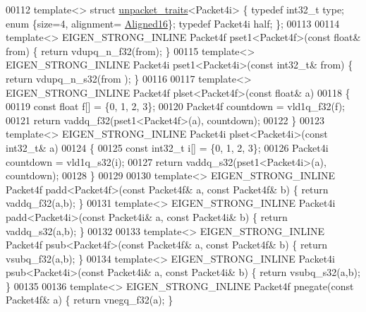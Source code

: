 \begin{DoxyCode}
{00112 \textcolor{keyword}{template}<> \textcolor{keyword}{struct }\hyperlink{struct_eigen_1_1internal_1_1unpacket__traits}{unpacket\_traits}<Packet4i> \{ \textcolor{keyword}{typedef} int32\_t type; \textcolor{keyword}{enum} \{size=4, alignment=
      \hyperlink{group__enums_gga45fe06e29902b7a2773de05ba27b47a1af8e2bf74b04c02199f62c5e3c06dbfcc}{Aligned16}\}; \textcolor{keyword}{typedef} Packet4i half; \};
00113 
00114 \textcolor{keyword}{template}<> EIGEN\_STRONG\_INLINE Packet4f pset1<Packet4f>(\textcolor{keyword}{const} \textcolor{keywordtype}{float}&  from) \{ \textcolor{keywordflow}{return} vdupq\_n\_f32(from); \}
00115 \textcolor{keyword}{template}<> EIGEN\_STRONG\_INLINE Packet4i pset1<Packet4i>(\textcolor{keyword}{const} int32\_t&    from)   \{ \textcolor{keywordflow}{return} vdupq\_n\_s32(from
      ); \}
00116 
00117 \textcolor{keyword}{template}<> EIGEN\_STRONG\_INLINE Packet4f plset<Packet4f>(\textcolor{keyword}{const} \textcolor{keywordtype}{float}& a)
00118 \{
00119   \textcolor{keyword}{const} \textcolor{keywordtype}{float} f[] = \{0, 1, 2, 3\};
00120   Packet4f countdown = vld1q\_f32(f);
00121   \textcolor{keywordflow}{return} vaddq\_f32(pset1<Packet4f>(a), countdown);
00122 \}
00123 \textcolor{keyword}{template}<> EIGEN\_STRONG\_INLINE Packet4i plset<Packet4i>(\textcolor{keyword}{const} int32\_t& a)
00124 \{
00125   \textcolor{keyword}{const} int32\_t i[] = \{0, 1, 2, 3\};
00126   Packet4i countdown = vld1q\_s32(i);
00127   \textcolor{keywordflow}{return} vaddq\_s32(pset1<Packet4i>(a), countdown);
00128 \}
00129 
00130 \textcolor{keyword}{template}<> EIGEN\_STRONG\_INLINE Packet4f padd<Packet4f>(\textcolor{keyword}{const} Packet4f& a, \textcolor{keyword}{const} Packet4f& b) \{ \textcolor{keywordflow}{return} 
      vaddq\_f32(a,b); \}
00131 \textcolor{keyword}{template}<> EIGEN\_STRONG\_INLINE Packet4i padd<Packet4i>(\textcolor{keyword}{const} Packet4i& a, \textcolor{keyword}{const} Packet4i& b) \{ \textcolor{keywordflow}{return} 
      vaddq\_s32(a,b); \}
00132 
00133 \textcolor{keyword}{template}<> EIGEN\_STRONG\_INLINE Packet4f psub<Packet4f>(\textcolor{keyword}{const} Packet4f& a, \textcolor{keyword}{const} Packet4f& b) \{ \textcolor{keywordflow}{return} 
      vsubq\_f32(a,b); \}
00134 \textcolor{keyword}{template}<> EIGEN\_STRONG\_INLINE Packet4i psub<Packet4i>(\textcolor{keyword}{const} Packet4i& a, \textcolor{keyword}{const} Packet4i& b) \{ \textcolor{keywordflow}{return} 
      vsubq\_s32(a,b); \}
00135 
00136 \textcolor{keyword}{template}<> EIGEN\_STRONG\_INLINE Packet4f pnegate(\textcolor{keyword}{const} Packet4f& a) \{ \textcolor{keywordflow}{return} vnegq\_f32(a); \}
}
\end{DoxyCode}
